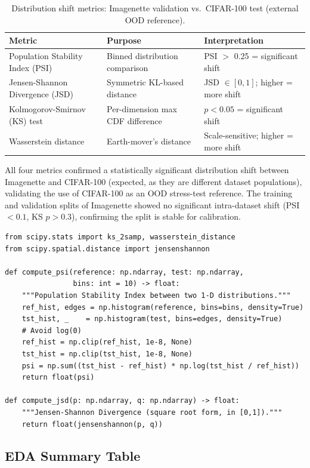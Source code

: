 \documentclass[12pt,a4paper]{article}
\begin{document}
\begin{table}[H]
\centering
\caption{Distribution shift metrics: Imagenette validation vs.\ CIFAR-100 test (external OOD reference).}
\label{tab:shift}
\begin{tabular}{lll}
\toprule
\textbf{Metric} & \textbf{Purpose} & \textbf{Interpretation} \\
\midrule
Population Stability Index (PSI) & Binned distribution comparison & PSI $>$ 0.25 = significant shift \\
Jensen-Shannon Divergence (JSD) & Symmetric KL-based distance & JSD $\in [0,1]$; higher = more shift \\
Kolmogorov-Smirnov (KS) test & Per-dimension max CDF difference & $p < 0.05$ = significant shift \\
Wasserstein distance & Earth-mover's distance & Scale-sensitive; higher = more shift \\
\bottomrule
\end{tabular}
\end{table}

All four metrics confirmed a statistically significant distribution shift between Imagenette and CIFAR-100 (expected, as they are different dataset populations), validating the use of CIFAR-100 as an OOD stress-test reference. The training and validation splits of Imagenette showed no significant intra-dataset shift (PSI $< 0.1$, KS $p > 0.3$), confirming the split is stable for calibration.

\begin{lstlisting}[caption={PSI and JSD computation (excerpt).},label={lst:shift}]
from scipy.stats import ks_2samp, wasserstein_distance
from scipy.spatial.distance import jensenshannon

def compute_psi(reference: np.ndarray, test: np.ndarray,
                bins: int = 10) -> float:
    """Population Stability Index between two 1-D distributions."""
    ref_hist, edges = np.histogram(reference, bins=bins, density=True)
    tst_hist, _    = np.histogram(test, bins=edges, density=True)
    # Avoid log(0)
    ref_hist = np.clip(ref_hist, 1e-8, None)
    tst_hist = np.clip(tst_hist, 1e-8, None)
    psi = np.sum((tst_hist - ref_hist) * np.log(tst_hist / ref_hist))
    return float(psi)

def compute_jsd(p: np.ndarray, q: np.ndarray) -> float:
    """Jensen-Shannon Divergence (square root form, in [0,1])."""
    return float(jensenshannon(p, q))
\end{lstlisting}

\subsection{EDA Summary Table}
\end{document}
